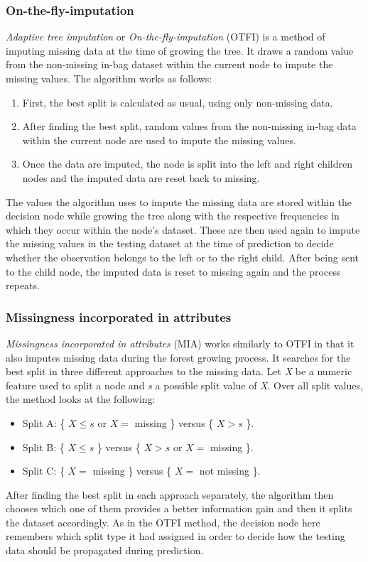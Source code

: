 \documentclass[11pt]{article}
\begin{document}
      \subsubsection{On-the-fly-imputation}
        {\it Adaptive tree imputation}\cite{rsf} or {\it On-the-fly-imputation}\cite{otfi} (OTFI) is a method of imputing missing data at the time of growing the tree. It draws a random value from the non-missing in-bag dataset within the current node to impute the missing values. The algorithm works as follows: 
        \begin{enumerate}
        \item First, the best split is calculated as usual, using only non-missing data.
        \item After finding the best split, random values from the non-missing in-bag data within the current node are used to impute the missing values.
        \item Once the data are imputed, the node is split into the left and right children nodes and the imputed data are reset back to missing.
        \end{enumerate}
        The values the algorithm uses to impute the missing data are stored within the decision node while growing the tree along with the respective frequencies in which they occur within the node's dataset. These are then used again to impute the missing values in the testing dataset at the time of prediction to decide whether the observation belongs to the left or to the right child. After being sent to the child node, the imputed data is reset to missing again and the process repeats.
      \subsubsection{Missingness incorporated in attributes}
        {\it Missingness incorporated in attributes}\cite{mia} (MIA) works similarly to OTFI in that it also imputes missing data during the forest growing process. It searches for the best split in three different approaches to the missing data. Let {\it X} be a numeric feature used to split a node and {\it s} a possible split value of {\it X}. Over all split values, the method looks at the following:
        \begin{itemize}
        \item Split A: \{ $X \leq s$ or $X =$ missing \} versus \{ $X > s$ \}.
        \item Split B: \{ $X \leq s$ \} versus \{ $X > s$ or $X =$ missing \}.
        \item Split C: \{ $X =$ missing \} versus \{ $X =$ not missing \}.
        \end{itemize}
        After finding the best split in each approach separately, the algorithm then chooses which one of them provides a better information gain and then it splits the dataset accordingly. As in the OTFI method, the decision node here remembers which split type it had assigned in order to decide how the testing data should be propagated during prediction.
\end{document}
